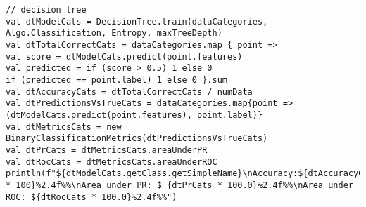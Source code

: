 \begin{lstlisting}
// decision tree
val dtModelCats = DecisionTree.train(dataCategories, Algo.Classification, Entropy, maxTreeDepth)
val dtTotalCorrectCats = dataCategories.map { point =>
val score = dtModelCats.predict(point.features)
val predicted = if (score > 0.5) 1 else 0
if (predicted == point.label) 1 else 0 }.sum
val dtAccuracyCats = dtTotalCorrectCats / numData
val dtPredictionsVsTrueCats = dataCategories.map{point =>
(dtModelCats.predict(point.features), point.label)}
val dtMetricsCats = new BinaryClassificationMetrics(dtPredictionsVsTrueCats)
val dtPrCats = dtMetricsCats.areaUnderPR
val dtRocCats = dtMetricsCats.areaUnderROC
println(f"${dtModelCats.getClass.getSimpleName}\nAccuracy:${dtAccuracyCats * 100}%2.4f%%\nArea under PR: $ {dtPrCats * 100.0}%2.4f%%\nArea under ROC: ${dtRocCats * 100.0}%2.4f%%")
\end{lstlisting}
